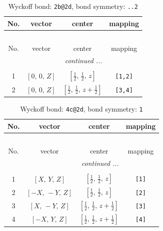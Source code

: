 \documentclass[fleqn,8pt]{jsarticle}
\begin{document}
\renewcommand{\arraystretch}{1.2}
\begin{longtable}{cccc}
\caption{Wyckoff bond: {\tt 2b@2d}, bond symmetry: {\tt ..2}}
 \\
 \hline \hline
No. & vector & center & mapping \\ \hline \endfirsthead

\multicolumn{3}{l}{\tablename\ \thetable{}} \\
 \hline \hline
No. & vector & center & mapping \\ \hline \endhead

 \hline \hline
\multicolumn{3}{r}{\footnotesize\it continued ...} \\ \endfoot

 \hline \hline
\multicolumn{3}{r}{} \\ \endlastfoot

1 & $\left[ 0,\, 0,\, Z \right]$ & $\left[ \frac{1}{2},\, \frac{1}{2},\, z \right]$ & {\tt [1,2]} \\ \hline
2 & $\left[ 0,\, 0,\, Z \right]$ & $\left[ \frac{1}{2},\, \frac{1}{2},\, z + \frac{1}{2} \right]$ & {\tt [3,4]} \\
\end{longtable}
\renewcommand{\arraystretch}{1.2}
\begin{longtable}{cccc}
\caption{Wyckoff bond: {\tt 4c@2d}, bond symmetry: {\tt 1}}
 \\
 \hline \hline
No. & vector & center & mapping \\ \hline \endfirsthead

\multicolumn{3}{l}{\tablename\ \thetable{}} \\
 \hline \hline
No. & vector & center & mapping \\ \hline \endhead

 \hline \hline
\multicolumn{3}{r}{\footnotesize\it continued ...} \\ \endfoot

 \hline \hline
\multicolumn{3}{r}{} \\ \endlastfoot

1 & $\left[ X,\, Y,\, Z \right]$ & $\left[ \frac{1}{2},\, \frac{1}{2},\, z \right]$ & {\tt [1]} \\ \hline
2 & $\left[ - X,\, - Y,\, Z \right]$ & $\left[ \frac{1}{2},\, \frac{1}{2},\, z \right]$ & {\tt [2]} \\ \hline
3 & $\left[ X,\, - Y,\, Z \right]$ & $\left[ \frac{1}{2},\, \frac{1}{2},\, z + \frac{1}{2} \right]$ & {\tt [3]} \\ \hline
4 & $\left[ - X,\, Y,\, Z \right]$ & $\left[ \frac{1}{2},\, \frac{1}{2},\, z + \frac{1}{2} \right]$ & {\tt [4]} \\
\end{longtable}
\end{document}

